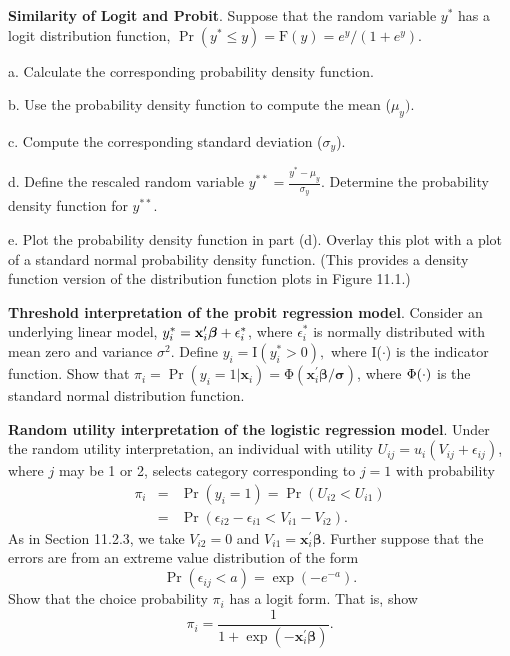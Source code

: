 \begin{exercises}


\item \textbf{Similarity of Logit and Probit}. Suppose that the random
variable $y^{\ast}$ has a logit distribution function, $\Pr(y^{\ast}
\leq y) = \mathrm{F}(y) = e^y/(1+e^y).$

a. Calculate the corresponding probability density function.

b. Use the probability density function to compute the mean
($\mu_y)$.

c. Compute the corresponding standard deviation ($\sigma_y$).

d. Define the rescaled random variable $y^{\ast \ast} =
\frac{y^{\ast}-\mu_y}{\sigma_y}.$ Determine the probability density
function for $y^{\ast \ast}$.

e. Plot the probability density function in part (d). Overlay this
plot with a plot of a standard normal probability density function.
(This provides a density function version of the distribution
function plots in Figure 11.1.)

\item \textbf{Threshold interpretation of the probit regression model}.
Consider an underlying linear model, $y_i^{\ast }=\mathbf{x}_i^{\mathbf{%
\prime }}\boldsymbol \beta+\epsilon_i^{\ast }$, where $\epsilon
_i^{\ast } $ is normally distributed with mean zero and variance
$\sigma ^{2}$. Define $y_i=\mathrm{I}(y_i^{\ast }>0),$ where I($\cdot$) is
the indicator
function. Show that $\pi_i=\Pr (y_i=1|\mathbf{x}_i)=\mathrm{\Phi }(%
\mathbf{x}_i^{\mathbf{\prime }}\mathbf{\beta /\sigma })$, where $\mathrm{%
\Phi }(\cdot)$ is the standard normal distribution function.

\item \textbf{Random utility interpretation of the logistic regression
model}.
Under the random utility interpretation, an individual with utility $%
U_{ij}=u_i(V_{ij}+\epsilon _{ij})$, where $j$ may be 1 or 2, selects
category corresponding to $j=1$ with probability
\begin{eqnarray*}
\pi_i &=& \Pr (y_i =1)=\mathrm{\Pr }(U_{i2}<U_{i1}) \\
&=&\mathrm{\Pr }(\epsilon _{i2}-\epsilon _{i1}<V_{i1}-V_{i2}).
\end{eqnarray*}
As in Section 11.2.3, we take $V_{i2}=0$ and
$V_{i1}=\mathbf{x}_i^{\mathbf{\prime}}\boldsymbol \beta$. Further
suppose that the errors are from an extreme value distribution of
the form
\begin{equation*}
\Pr (\epsilon_{ij}<a)=\exp (-e^{-a}).
\end{equation*}%
Show that the choice probability $\pi_i$ has a logit form. That is,
show
\begin{equation*}
\pi_i=\frac{1}{1+\exp (-\mathbf{x}_i^{\mathbf{\prime }}\boldsymbol
\beta)}.
\end{equation*}


\end{exercises}
